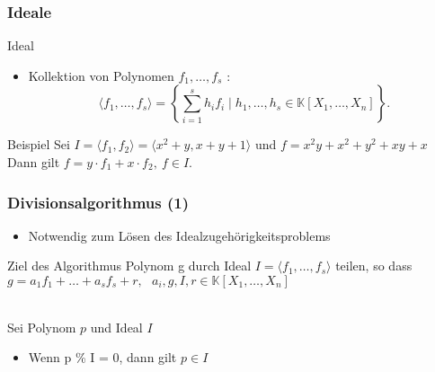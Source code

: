 \documentclass{beamer}
\begin{document}
\begin{frame}[fragile]
\frametitle{Ideale}

\begin{block}{Ideal }
\begin{itemize}
\item Kollektion von Polynomen $f_{1}, \dots , f_{s}$ : \\
\[ \langle f_{1}, \dots , f_{s} \rangle = \left\lbrace  \sum_{i=1}^s h_{i}f_{i} \mid h_{1}, \dots , h_{s} \in \mathbb{K}\left[X_{1}, \dots, X_{n}\right] \right\rbrace. \] 
 
\end{itemize}

\end{block}

\begin{block}{Beispiel}
Sei $ I= \langle f_{1},f_{2} \rangle = \langle x^{2}+y, x+y+1 \rangle $ und $f=x^{2}y+x^{2}+y^{2}+xy+x$ \\
Dann gilt $f= y \cdot f_{1} + x \cdot f_{2},~f\in I$.

\end{block}


\end{frame}

\begin{frame}
\frametitle{Divisionsalgorithmus (1)}



\begin{itemize}
\item Notwendig zum Lösen des Idealzugehörigkeitsproblems


\end{itemize}

\begin{block}{Ziel des Algorithmus}
Polynom g durch Ideal $ I = \langle f_{1}, \dots , f_{s} \rangle  $ teilen, so dass 
$ g = a_{1}f_{1} + \ldots + a_{s}f_{s} + r ,~~~ a_{i},g,I,r \in \mathbb{K}\left[X_{1}, \dots, X_{n}\right]  $
\end{block}

~\\

Sei Polynom $p$ und Ideal $I$  

\begin{itemize}
\item Wenn p \% I = 0, dann gilt $ p \in I$


\end{itemize}



	
\end{frame}
\end{document}
